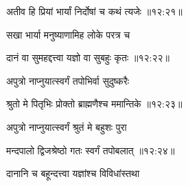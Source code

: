 
{\devanagarifont अतीव हि प्रियां भार्यां निर्दोषां च कथं त्यजेः {॥१२:२१॥} \veg\dontdisplaylinenum }%

{\devanagarifont सखा भार्या मनुष्याणामिह लोके परत्र च \thinspace{\dandab} \dontdisplaylinenum }%


{\devanagarifont दानं वा सुमहद्दत्त्वा यज्ञो वा सुबहुः कृतः {॥१२:२२॥} \veg\dontdisplaylinenum }%

{\devanagarifont अपुत्रो नाप्नुयात्स्वर्गं तपोभिर्वा सुदुष्करैः \thinspace{\dandab} \dontdisplaylinenum }%


{\devanagarifont श्रुतो मे पितृभिः प्रोक्तो ब्राह्मणैश्च ममान्तिके {॥१२:२३॥} \veg\dontdisplaylinenum }%

{\devanagarifont अपुत्रो नाप्नुयात्स्वर्गं श्रुतं मे बहुशः पुरा \thinspace{\dandab} \dontdisplaylinenum }%


{\devanagarifont मन्दपालो द्विजश्रेष्ठो गतः स्वर्गं तपोबलात् {॥१२:२४॥} \veg\dontdisplaylinenum }%

{\devanagarifont दानानि च बहून्दत्त्वा यज्ञांश्च विविधांस्तथा \thinspace{\dandab} \dontdisplaylinenum }%

